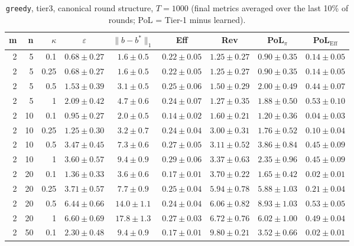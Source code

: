 \begin{table}[htbp]
\centering
\scriptsize
\caption{\texttt{greedy}, tier3, canonical round structure, $T=1000$ (final metrics averaged over the last 10\% of rounds; PoL = Tier-1 minus learned).}
\label{tab:tier3_greedy_canonical}
\begin{tabular}{@{}rrrcccccc@{}}
\toprule
m & n & $\kappa$ & $\varepsilon$ & $\|b-b^*\|_1$ & Eff & Rev & PoL$_\pi$ & PoL$_\mathrm{Eff}$ \\
\midrule
2 & 5 & 0.1 & $0.68 \pm 0.27$ & $1.6 \pm 0.5$ & $0.22 \pm 0.05$ & $1.25 \pm 0.27$ & $0.90 \pm 0.35$ & $0.14 \pm 0.05$ \\
2 & 5 & 0.25 & $0.68 \pm 0.27$ & $1.6 \pm 0.5$ & $0.22 \pm 0.05$ & $1.25 \pm 0.27$ & $0.90 \pm 0.35$ & $0.14 \pm 0.05$ \\
2 & 5 & 0.5 & $1.53 \pm 0.39$ & $3.1 \pm 0.5$ & $0.25 \pm 0.06$ & $1.50 \pm 0.29$ & $2.00 \pm 0.49$ & $0.44 \pm 0.07$ \\
2 & 5 & 1 & $2.09 \pm 0.42$ & $4.7 \pm 0.6$ & $0.24 \pm 0.07$ & $1.27 \pm 0.35$ & $1.88 \pm 0.50$ & $0.53 \pm 0.10$ \\
2 & 10 & 0.1 & $0.95 \pm 0.27$ & $2.0 \pm 0.5$ & $0.14 \pm 0.02$ & $1.60 \pm 0.21$ & $1.20 \pm 0.36$ & $0.04 \pm 0.03$ \\
2 & 10 & 0.25 & $1.25 \pm 0.30$ & $3.2 \pm 0.7$ & $0.24 \pm 0.04$ & $3.00 \pm 0.31$ & $1.76 \pm 0.52$ & $0.10 \pm 0.04$ \\
2 & 10 & 0.5 & $3.47 \pm 0.45$ & $7.3 \pm 0.6$ & $0.27 \pm 0.05$ & $3.11 \pm 0.52$ & $3.86 \pm 0.84$ & $0.45 \pm 0.09$ \\
2 & 10 & 1 & $3.60 \pm 0.57$ & $9.4 \pm 0.9$ & $0.29 \pm 0.06$ & $3.37 \pm 0.63$ & $2.35 \pm 0.96$ & $0.45 \pm 0.09$ \\
2 & 20 & 0.1 & $1.36 \pm 0.33$ & $3.6 \pm 0.6$ & $0.17 \pm 0.01$ & $3.70 \pm 0.22$ & $1.65 \pm 0.42$ & $0.02 \pm 0.01$ \\
2 & 20 & 0.25 & $3.71 \pm 0.57$ & $7.7 \pm 0.9$ & $0.25 \pm 0.04$ & $5.94 \pm 0.78$ & $5.88 \pm 1.03$ & $0.21 \pm 0.04$ \\
2 & 20 & 0.5 & $6.44 \pm 0.66$ & $14.0 \pm 1.1$ & $0.24 \pm 0.04$ & $6.06 \pm 0.82$ & $8.93 \pm 1.03$ & $0.53 \pm 0.05$ \\
2 & 20 & 1 & $6.60 \pm 0.69$ & $17.8 \pm 1.3$ & $0.27 \pm 0.03$ & $6.72 \pm 0.76$ & $6.02 \pm 1.00$ & $0.49 \pm 0.04$ \\
2 & 50 & 0.1 & $2.30 \pm 0.48$ & $9.4 \pm 0.9$ & $0.17 \pm 0.01$ & $9.80 \pm 0.21$ & $3.52 \pm 0.66$ & $0.02 \pm 0.01$ \\

\end{tabular}
\end{table}
